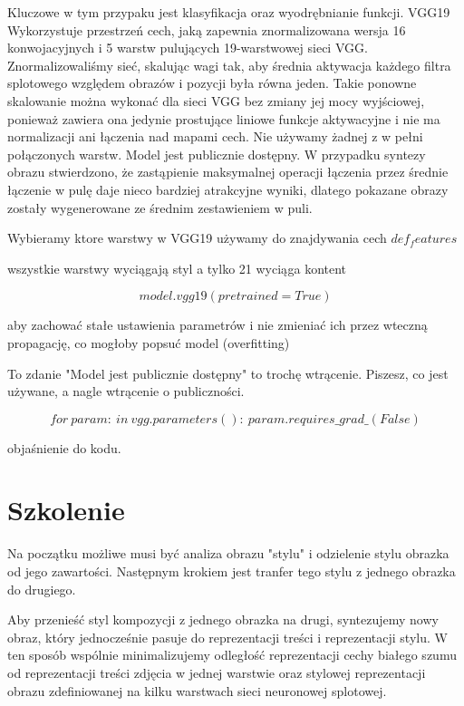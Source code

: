 \documentclass[brudnopis]{xmgr}
\begin{document}
Kluczowe w tym przypaku jest klasyfikacja oraz wyodrębnianie funkcji.
VGG19 Wykorzystuje przestrzeń cech, jaką zapewnia znormalizowana wersja 16 konwojacyjnych i 5 warstw pulujących 19-warstwowej sieci VGG. Znormalizowaliśmy sieć, skalując wagi tak, aby średnia aktywacja każdego filtra splotowego względem obrazów i pozycji była równa jeden. Takie ponowne skalowanie można wykonać dla sieci VGG bez zmiany jej mocy wyjściowej, ponieważ zawiera ona jedynie prostujące liniowe funkcje aktywacyjne i nie ma normalizacji ani łączenia nad mapami cech. Nie używamy żadnej z w pełni połączonych warstw. Model jest publicznie dostępny. W przypadku syntezy obrazu stwierdzono, że zastąpienie maksymalnej operacji łączenia przez średnie łączenie w pulę daje nieco bardziej atrakcyjne wyniki, dlatego pokazane obrazy zostały wygenerowane ze średnim zestawieniem w puli. 

Wybieramy ktore warstwy w VGG19 używamy do znajdywania cech 
$def_features$

wszystkie warstwy wyciągają styl a tylko 21 wyciąga kontent

\begin{equation}
model.vgg19(pretrained=True)
\end{equation}

aby zachować stałe ustawienia parametrów i nie zmieniać ich przez wteczną propagację, co mogłoby popsuć model (overfitting)


To zdanie "Model jest publicznie dostępny" to trochę wtrącenie. Piszesz, co jest używane, a nagle wtrącenie o publiczności.

\begin{equation}
for\:param:\ in \: vgg.parameters():\:
	param.requires\_grad\_(False)
\end{equation}

objaśnienie do kodu.

\section{Szkolenie\label{s:dsssl}}

Na początku możliwe musi być analiza obrazu "stylu" i odzielenie stylu obrazka od jego zawartości. 
Następnym krokiem jest tranfer tego stylu z jednego obrazka do drugiego.

Aby przenieść styl kompozycji z jednego obrazka na drugi, syntezujemy nowy obraz, który jednocześnie pasuje do reprezentacji treści i reprezentacji stylu. W ten sposób wspólnie minimalizujemy odległość reprezentacji cechy białego szumu od reprezentacji treści zdjęcia w jednej warstwie oraz stylowej reprezentacji obrazu zdefiniowanej na kilku warstwach sieci neuronowej splotowej.
\end{document}
